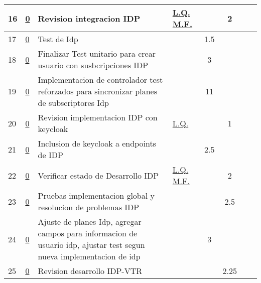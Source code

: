 \documentclass{article}
\begin{document}
\begin{longtable}{|m{0.5cm}|m{1.2cm}|p{6cm}|m{1.5cm}||c|c|c|c||}
                 \label{16}16  &  \hyperref[0]{\color{blue}0}  & Revision integracion IDP &  
                  \hyperref[L.Q.]{\color{blue}L.Q.} \newline  \hyperref[M.F.]{\color{blue}M.F.}  &  & 2 &  & \\ \hline 

                 \label{17}17  &  \hyperref[0]{\color{blue}0}  & Test de Idp &  
                 & 1.5 &  &  & \\ \hline 

                 \label{18}18  &  \hyperref[0]{\color{blue}0}  & Finalizar Test unitario para crear usuario con susbcripciones IDP &  
                 & 3 &  &  & \\ \hline 

                 \label{19}19  &  \hyperref[0]{\color{blue}0}  & Implementacion de controlador test reforzados para sincronizar planes de subscriptores Idp &  
                 & 11 &  &  & \\ \hline 

                 \label{20}20  &  \hyperref[0]{\color{blue}0}  & Revision implementacion IDP con keycloak &  
                  \hyperref[L.Q.]{\color{blue}L.Q.}  &  & 1 &  & \\ \hline 

                 \label{21}21  &  \hyperref[0]{\color{blue}0}  & Inclusion de keycloak a endpoints de IDP &  
                 & 2.5 &  &  & \\ \hline 

                 \label{22}22  &  \hyperref[0]{\color{blue}0}  & Verificar estado de Desarrollo IDP &  
                  \hyperref[L.Q.]{\color{blue}L.Q.} \newline  \hyperref[M.F.]{\color{blue}M.F.}  &  & 2 &  & \\ \hline 

                 \label{23}23  &  \hyperref[0]{\color{blue}0}  & Pruebas implementacion global y resolucion de problemas IDP &  
                 &  & 2.5 &  & \\ \hline 

                 \label{24}24  &  \hyperref[0]{\color{blue}0}  & Ajuste de planes Idp, agregar campos para informacion de usuario idp, ajustar test segun nueva implementacion de idp &  
                 & 3 &  &  & \\ \hline 

                 \label{25}25  &  \hyperref[0]{\color{blue}0}  & Revision desarrollo IDP-VTR &  
                 &  & 2.25 &  & \\ \hline 


\end{longtable}
\end{document}
